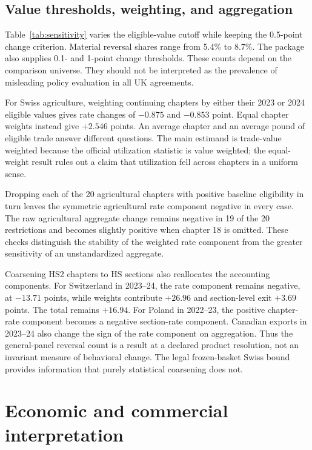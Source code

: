 \documentclass[11pt,a4paper]{article}
\begin{document}
\subsection{Value thresholds, weighting, and aggregation}
Table~\ref{tab:sensitivity} varies the eligible-value cutoff while keeping the 0.5-point change criterion. Material reversal shares range from 5.4\% to 8.7\%. The package also supplies 0.1- and 1-point change thresholds. These counts depend on the comparison universe. They should not be interpreted as the prevalence of misleading policy evaluation in all UK agreements.


For Swiss agriculture, weighting continuing chapters by either their 2023 or 2024 eligible values gives rate changes of $-0.875$ and $-0.853$ point. Equal chapter weights instead give $+2.546$ points. An average chapter and an average pound of eligible trade answer different questions. The main estimand is trade-value weighted because the official utilization statistic is value weighted; the equal-weight result rules out a claim that utilization fell across chapters in a uniform sense.

Dropping each of the 20 agricultural chapters with positive baseline eligibility in turn leaves the symmetric agricultural rate component negative in every case. The raw agricultural aggregate change remains negative in 19 of the 20 restrictions and becomes slightly positive when chapter 18 is omitted. These checks distinguish the stability of the weighted rate component from the greater sensitivity of an unstandardized aggregate.

Coarsening HS2 chapters to HS sections also reallocates the accounting components. For Switzerland in 2023--24, the rate component remains negative, at $-13.71$ points, while weights contribute $+26.96$ and section-level exit $+3.69$ points. The total remains $+16.94$. For Poland in 2022--23, the positive chapter-rate component becomes a negative section-rate component. Canadian exports in 2023--24 also change the sign of the rate component on aggregation. Thus the general-panel reversal count is a result at a declared product resolution, not an invariant measure of behavioral change. The legal frozen-basket Swiss bound provides information that purely statistical coarsening does not.

\section{Economic and commercial interpretation}
\end{document}
